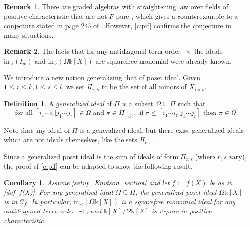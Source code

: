 \documentclass[12pt]{amsart}
\renewcommand{\leq}{\leqslant}
\newtheorem{corollary}[corollary]{Corollary}
\theoremstyle{definition}
\newtheorem{definition}[definition]{Definition}
\newtheorem{remark}[remark]{Remark}
\renewcommand{\(}{\left(}
\renewcommand{\)}{\right)}
\newcommand{\kk}{\mathbb{k}}
\renewcommand{\!}[1]{{\color{red}\text{\Huge$\star$ }#1}}
\newcommand{\ls}{\leqslant}%
\newcommand{\C}{\mathcal{C}}
\newcommand{\init}{\mathrm{in}}
\begin{document}
\begin{remark}
There are graded algebras with straightening law over fields of positive characteristic that are not $F$-pure \cite[Remark 5.2]{KoleyVarbaro}, which gives a counterexample  to a conjecture stated in page 245 of \cite{eisenbud80}. However, \autoref{c:pif} confirms the conjecture in many situations.
\end{remark}

\begin{remark}
The facts that for any
antidiagonal term order $\prec$ the ideals $\init_\prec(I_w)$ \cite[Theorem B]{knutson2005grobner}
and  $\init_\prec(\Omega \kk[X])$ \cite[Theorem 2.5]{HerzogTrung} %
are squarefree monomial
were already known. 
\end{remark}


We introduce a new notion generalizing that of poset ideal. Given $1\leq r\leq k, 1\leq s\leq l$, we set $\Pi_{r,s}$ to be the set of all minors of $X_{r\times s}$.
\begin{definition}
A {\it generalized  ideal} of $\Pi$ is a subset $\Omega\subseteq \Pi$ such that 
$$ \text{for all }[i_1\cdots i_r|j_1\cdots j_r]\in\Omega \text{ and }\pi\in\Pi_{i_r,j_r}, \text{ if } \pi\ls [i_1\cdots i_r|j_1\cdots j_r] \text{ then } \pi\in\Omega.$$
\end{definition}

Note that  any ideal of $\Pi$ is a generalized ideal, but there exist  generalized  ideals which are not  ideals themselves, like the sets $\Pi_{r,s}$. 

Since a generalized poset ideal is the sum of  ideals of  form $\Pi_{r,s}$ (where $r,s$ vary),  the proof of \autoref{c:pif} can be adapted to show the  %
following result.

\begin{corollary}\label{c:gpif}
Assume \autoref{setup_Knutson_section} and  let $f:=f(X) $ be as in \autoref{def_f(X)}. For any generalized ideal $\Omega\subseteq \Pi$, the generalized poset ideal $\Omega \kk[X]$  is in $\C_{f}$. 
In particular, $\init_\prec(\Omega \kk[X])$ is a squarefree monomial ideal for any antidiagonal term order $\prec$, and $\kk[X]/\Omega \kk[X]$ is $F$-pure  in positive characteristic.
\end{corollary}





\end{document}
